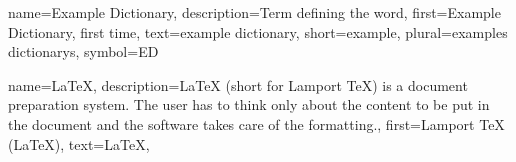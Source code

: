 {
    name={Example Dictionary},
    description={Term defining the word},
    first={Example Dictionary, first time},
    text={example dictionary},
    short={example},
    plural={examples dictionarys},
    symbol={ED}
}

{
    name={\LaTeX},
    description={LaTeX (short for Lamport TeX) is a document preparation system. The user has to
            think only about the content to be put in the document and the software takes care of the formatting.},
    first={Lamport TeX (\LaTeX)},
    text={\LaTeX},
}